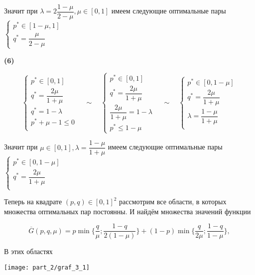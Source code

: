 Значит при $\lambda = 2\dfrac{1 - \mu}{2 - \mu}, \mu \in [0, 1]$ 
имеем следующие оптимальные пары
$
	\begin{cases}
		p^* \in [1 - \mu, 1] \\
		q^* = \dfrac{\mu}{2 - \mu}
	\end{cases}
$

\textbf{(6)}

$$
	\begin{cases}
		p^* \in [0, 1] \\
		q^*= \dfrac{2\mu}{1 + \mu} \\
		q^* = 1 - \lambda \\
		p^* + \mu - 1 \leqslant 0 \\
	\end{cases}
	\quad \sim \quad
	\begin{cases}
		p^* \in [0, 1] \\
		q^* = \dfrac{2\mu}{1 + \mu} \\
		\dfrac{2\mu}{1 + \mu} = 1 - \lambda \\
		p^* \leqslant 1 - \mu 
	\end{cases}
	\quad \sim \quad
	\begin{cases}
		p^* \in [0, 1 - \mu] \\
		q^* = \dfrac{2\mu}{1 + \mu} \\
		\lambda = \dfrac{1 - \mu}{1 + \mu} \\
	\end{cases}
$$

Значит при $\mu \in [0, 1], \lambda = \dfrac{1 - \mu}{1 + \mu}$
имеем следующие оптимальные пары
$
	\begin{cases}
		p^* \in [0, 1 - \mu] \\
		q^* = \dfrac{2\mu}{1 + \mu} \\
	\end{cases}
$

Теперь на квадрате $(p, q) \in [0, 1]^2$ рассмотрим все области,
в которых множества оптимальных пар постоянны. 
И найдём множества значений функции 

$$
	\overline G(p, q, \mu)=
	p \min \{
		\dfrac{q}{\mu};
		\dfrac{1-q}{2(1-\mu)}
	\} + (1 - p) \min \{
		\dfrac{q}{2\mu};
		\dfrac{1 - q}{1 - \mu}
	\},
$$

В этих областях

\begin{center}
\texttt{[image: part\_2/graf\_3\_1]}
\end{center}

